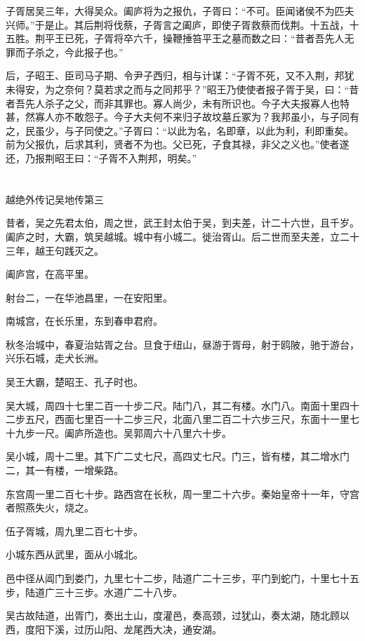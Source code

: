 \documentclass[12pt,UTF8]{ctexbook}
\begin{document}
子胥居吴三年，大得吴众。阖庐将为之报仇，子胥曰：“不可。臣闻诸侯不为匹夫兴师。”于是止。其后荆将伐蔡，子胥言之阖庐，即使子胥救蔡而伐荆。十五战，十五胜。荆平王已死，子胥将卒六千，操鞭捶笞平王之墓而数之曰：“昔者吾先人无罪而子杀之，今此报子也。”

后，子昭王、臣司马子期、令尹子西归，相与计谋：“子胥不死，又不入荆，邦犹未得安，为之奈何？莫若求之而与之同邦乎？”昭王乃使使者报子胥于吴，曰：“昔者吾先人杀子之父，而非其罪也。寡人尚少，未有所识也。今子大夫报寡人也特甚，然寡人亦不敢怨子。今子大夫何不来归子故坟墓丘冢为？我邦虽小，与子同有之，民虽少，与子同使之。”子胥曰：“以此为名，名即章，以此为利，利即重矣。前为父报仇，后求其利，贤者不为也。父已死，子食其禄，非父之义也。”使者遂还，乃报荆昭王曰：“子胥不入荆邦，明矣。”

\part{}

越绝外传记吴地传第三

昔者，吴之先君太伯，周之世，武王封太伯于吴，到夫差，计二十六世，且千岁。阖庐之时，大霸，筑吴越城。城中有小城二。徙治胥山。后二世而至夫差，立二十三年，越王句践灭之。

阖庐宫，在高平里。

射台二，一在华池昌里，一在安阳里。

南城宫，在长乐里，东到春申君府。

秋冬治城中，春夏治姑胥之台。旦食于纽山，昼游于胥母，射于鸥陂，驰于游台，兴乐石城，走犬长洲。

吴王大霸，楚昭王、孔子时也。

吴大城，周四十七里二百一十步二尺。陆门八，其二有楼。水门八。南面十里四十二步五尺，西面七里百一十二步三尺，北面八里二百二十六步三尺，东面十一里七十九步一尺。阖庐所造也。吴郭周六十八里六十步。

吴小城，周十二里。其下广二丈七尺，高四丈七尺。门三，皆有楼，其二增水门二，其一有楼，一增柴路。

东宫周一里二百七十步。路西宫在长秋，周一里二十六步。秦始皇帝十一年，守宫者照燕失火，烧之。

伍子胥城，周九里二百七十步。

小城东西从武里，面从小城北。

邑中径从阊门到娄门，九里七十二步，陆道广二十三步，平门到蛇门，十里七十五步，陆道广三十三步。水道广二十八步。

吴古故陆道，出胥门，奏出土山，度灌邑，奏高颈，过犹山，奏太湖，随北顾以西，度阳下溪，过历山阳、龙尾西大决，通安湖。
\end{document}

